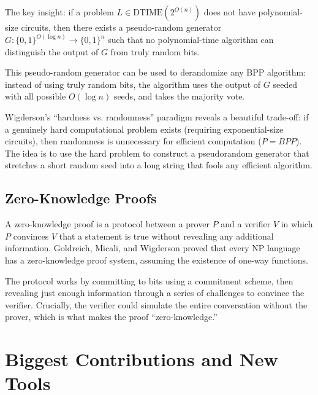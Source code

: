 The key insight: if a problem $L \in \text{DTIME}(2^{O(n)})$ does not have polynomial-size circuits, then there exists a pseudo-random generator $G: \{0,1\}^{O(\log n)} \to \{0,1\}^n$ such that no polynomial-time algorithm can distinguish the output of $G$ from truly random bits.

This pseudo-random generator can be used to derandomize any BPP algorithm: instead of using truly random bits, the algorithm uses the output of $G$ seeded with all possible $O(\log n)$ seeds, and takes the majority vote.

\begin{bigidea}
Wigderson's ``hardness vs. randomness'' paradigm reveals a beautiful trade-off: if a genuinely hard computational problem exists (requiring exponential-size circuits), then randomness is unnecessary for efficient computation ($P = BPP$). The idea is to use the hard problem to construct a pseudorandom generator that stretches a short random seed into a long string that fools any efficient algorithm.
\end{bigidea}

\subsection{Zero-Knowledge Proofs}

A zero-knowledge proof is a protocol between a prover $P$ and a verifier $V$ in which $P$ convinces $V$ that a statement is true without revealing any additional information. Goldreich, Micali, and Wigderson proved that every NP language has a zero-knowledge proof system, assuming the existence of one-way functions.

The protocol works by committing to bits using a commitment scheme, then revealing just enough information through a series of challenges to convince the verifier. Crucially, the verifier could simulate the entire conversation without the prover, which is what makes the proof ``zero-knowledge.''

\section{Biggest Contributions and New Tools}

